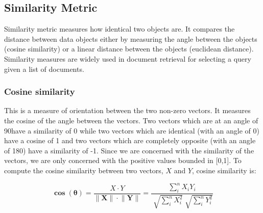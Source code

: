 %
% 
% 

\subsection{Similarity Metric}
Similarity metric measures how identical two objects are. It compares the distance between data objects either by measuring the angle between the objects (cosine similarity) or a linear distance between the objects (euclidean distance). Similarity measures are widely used in document retrieval for selecting a query given a list of documents. 

\subsubsection{Cosine similarity}

This is a measure of orientation between the two non-zero vectors. It measures the cosine of the angle between the vectors. Two vectors which are at an angle of 90\degree  have a similarity of 0 while two vectors which are identical (with an angle of 0\degree) have a cosine of 1 and two vectors which are completely opposite (with an angle of 180\degree) have a similarity of -1. Since we are concerned with the similarity of the vectors, we are only concerned with the positive values bounded in [0,1]. To compute the cosine similarity between two vectors, $X$ and $Y$, cosine similarity is:

\[\mathbf{\cos{(\theta)}} = \dfrac{X \cdot  Y}{ \lVert \mathbf{X} \rVert \cdot \lVert \mathbf{Y} \rVert} =\dfrac{\sum_{i}^n X_i Y_i }{\sqrt[]{\sum_{i}^n X_i^2} \sqrt[]{\sum_{i}^n Y_i^2}}  \]

%
%
%
%





